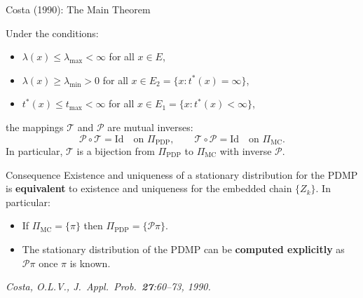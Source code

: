 \begin{frame}{Costa (1990): The Main Theorem}

  \begin{theorem}
    Under the conditions:
    \begin{itemize}
      \item $\lambda(x) \leq \lambda_{\max} < \infty$ for all
            $x \in E$,
      \item $\lambda(x) \geq \lambda_{\min} > 0$ for all $x \in E_2
            = \{x : t^*(x) = \infty\}$,
      \item $t^*(x) \leq t_{\max} < \infty$ for all $x \in E_1
            = \{x : t^*(x) < \infty\}$,
    \end{itemize}
    the mappings $\mathcal{T}$ and $\mathcal{P}$ are mutual inverses:
    \[
      \mathcal{P} \circ \mathcal{T} = \mathrm{Id}
      \quad \text{on } \Pi_{\mathrm{PDP}},
      \qquad
      \mathcal{T} \circ \mathcal{P} = \mathrm{Id}
      \quad \text{on } \Pi_{\mathrm{MC}}.
    \]
    In particular, $\mathcal{T}$ is a bijection from
    $\Pi_{\mathrm{PDP}}$ to $\Pi_{\mathrm{MC}}$ with inverse
    $\mathcal{P}$.
  \end{theorem}

  \bigskip
  \begin{block}{Consequence}
    Existence and uniqueness of a stationary distribution for the
    PDMP is \textbf{equivalent} to existence and uniqueness for
    the embedded chain $\{Z_k\}$. In particular:
    \begin{itemize}
      \setlength\itemsep{4pt}
      \item If $\Pi_{\mathrm{MC}} = \{\pi\}$ then
            $\Pi_{\mathrm{PDP}} = \{\mathcal{P}\pi\}$.
      \item The stationary distribution of the PDMP can be
            \textbf{computed explicitly} as $\mathcal{P}\pi$ once
            $\pi$ is known.
    \end{itemize}
  \end{block}

  \bigskip
  \textit{Costa, O.L.V., J.\ Appl.\ Prob.\ \textbf{27}:60--73,
  1990.}

\end{frame}

